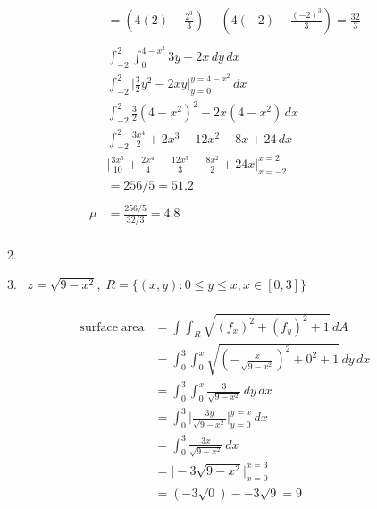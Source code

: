 \documentclass[11pt]{article}
\newcommand\Item[1][]{%
  \ifx\relax#1\relax  \item \else \item[#1] \fi
  \abovedisplayskip=0pt\abovedisplayshortskip=0pt~\vspace*{-\baselineskip}}
\begin{document}
\begin{preview}
\begin{enumerate}
\begin{enumerate}
\begin{align*}
                          & = (4(2)-\frac{2^{3}}{3}) - (4(-2)-\frac{(-2)^{3}}{3}) = \frac{32}{3}                       \\\\
                          & \int_{-2}^{2} \int_{0}^{4-x^{2}} 3y - 2x \,dy  \,dx                                        \\
                          & \int_{-2}^{2} \Big| \frac{3}{2}y^2 - 2xy \Big|_{y=0}^{y=4-x^{2}}  \,dx                     \\
                          & \int_{-2}^{2} \frac{3}{2}(4-x^{2})^2 - 2x(4-x^{2})  \,dx                                   \\
                          & \int_{-2}^{2} \frac{3x^4}{2}+2x^3-12x^2-8x+24 \,dx                                         \\
                          & \Big| \frac{3x^5}{10}+\frac{2x^4}{4}-\frac{12x^3}{3}-\frac{8x^2}{2}+24x \Big|_{x=-2}^{x=2} \\
                          & = 256/5 = 51.2                                                                             \\\\
                      \mu & = \frac{256/5}{32/3} = 4.8                                                                 \\
                  \end{align*}
                  \Item $z=\sqrt{9-x^{2}}, \; R = \{(x,y) : 0 \le y \le x, x \in [0,3]\}$ \\\\
                  \begin{align*}
                      \mathrm{surface \; area} &= \int \int_R \sqrt{(f_{x})^2 + (f_{y})^2 +1} \, dA \\ 
                      &= \int_{0}^{3} \int_{0}^{x} \sqrt{\left(-\frac{x}{\sqrt{9-x^2}}\right)^2 + 0^2 + 1} \,dy \,dx \\ 
                      &= \int_{0}^{3} \int_{0}^{x} \frac{3}{\sqrt{9-x^{2}}} \,dy \,dx \\
                      &= \int_{0}^{3} \Big| \frac{3y}{\sqrt{9-x^{2}}} \Big|_{y=0}^{y=x} \,dx \\
                      &= \int_{0}^{3} \frac{3x}{\sqrt{9-x^{2}}} \,dx \\
                      &= \Big| -3\sqrt{9-x^2} \Big|_{x=0}^{x=3} \\
                      &= (-3\sqrt{0}) - -3\sqrt{9} = 9
                  \end{align*}

\end{enumerate}
\end{enumerate}
\end{preview}
\end{document}
